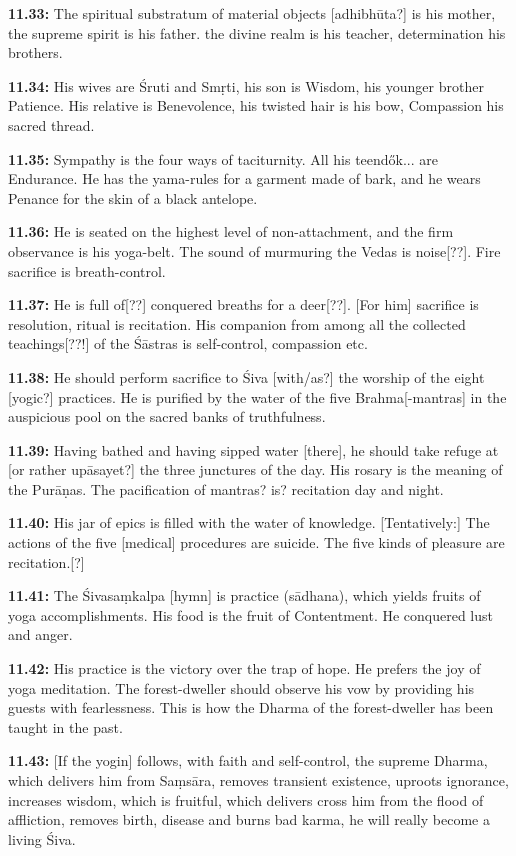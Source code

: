 \documentclass{article}
\newcommand{\vsnum}[1]{\textbf{#1}}
\begin{document}
\vsnum{11.33: }The spiritual substratum of material objects [adhibhūta?] is his mother, the supreme spirit is his father. the divine realm is his teacher, determination his brothers.

\vsnum{11.34: }His wives are Śruti and Smṛti, his son is Wisdom, his younger brother Patience. His relative is Benevolence, his twisted hair is his bow, Compassion his sacred thread.

\vsnum{11.35: }Sympathy is the four ways of taciturnity. All his teendők... are Endurance. He has the yama-rules for a garment made of bark, and he wears Penance for the skin of a black antelope.

\vsnum{11.36: }He is seated on the highest level of non-attachment, and the firm observance is his yoga-belt. The sound of murmuring the Vedas is noise[??]. Fire sacrifice is breath-control.

\vsnum{11.37: }He is full of[??] conquered breaths for a deer[??]. [For him] sacrifice is resolution, ritual is recitation. His companion from among all the collected teachings[??!] of the Śāstras is self-control, compassion etc.

\vsnum{11.38: }He should perform sacrifice to Śiva [with/as?] the worship of the eight [yogic?] practices. He is purified by the water of the five Brahma[-mantras] in the auspicious pool on the sacred banks of truthfulness.

\vsnum{11.39: }Having bathed and having sipped water [there], he should take refuge at [or rather upāsayet?] the three junctures of the day. His rosary is the meaning of the Purāṇas. The pacification of mantras? is? recitation day and night.

\vsnum{11.40: }His jar of epics is filled with the water of knowledge. [Tentatively:] The actions of the five [medical] procedures are suicide. The five kinds of pleasure are recitation.[?]

\vsnum{11.41: }The Śivasaṃkalpa [hymn] is practice (sādhana), which yields fruits of yoga accomplishments. His food is the fruit of Contentment. He conquered lust and anger.

\vsnum{11.42: }His practice is the victory over the trap of hope. He prefers the joy of yoga meditation. The forest-dweller should observe his vow by providing his guests with fearlessness. This is how the Dharma of the forest-dweller has been taught in the past.

\vsnum{11.43: }[If the yogin] follows, with faith and self-control, the supreme Dharma, which delivers him from Saṃsāra, removes transient existence, uproots ignorance, increases wisdom, which is fruitful, which delivers cross him from the flood of affliction, removes birth, disease and burns bad karma, he will really become a living Śiva.
\end{document}
